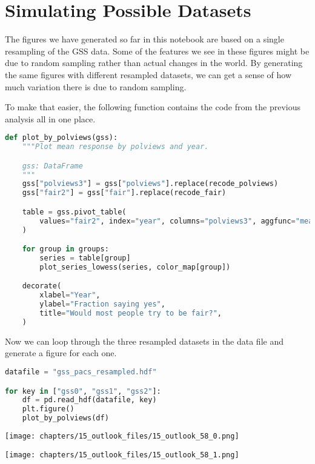\section{Simulating Possible
Datasets}\label{simulating-possible-datasets}

The figures we have generated so far in this notebook are based on a
single resampling of the GSS data. Some of the features we see in these
figures might be due to random sampling rather than actual changes in
the world. By generating the same figures with different resampled
datasets, we can get a sense of how much variation there is due to
random sampling.

To make that easier, the following function contains the code from the
previous analysis all in one place.

\begin{lstlisting}[language=Python,style=source]
def plot_by_polviews(gss):
    """Plot mean response by polviews and year.

    gss: DataFrame
    """
    gss["polviews3"] = gss["polviews"].replace(recode_polviews)
    gss["fair2"] = gss["fair"].replace(recode_fair)

    table = gss.pivot_table(
        values="fair2", index="year", columns="polviews3", aggfunc="mean"
    )

    for group in groups:
        series = table[group]
        plot_series_lowess(series, color_map[group])

    decorate(
        xlabel="Year",
        ylabel="Fraction saying yes",
        title="Would most people try to be fair?",
    )
\end{lstlisting}

Now we can loop through the three resampled datasets in the data file
and generate a figure for each one.

\begin{lstlisting}[language=Python,style=source]
datafile = "gss_pacs_resampled.hdf"

for key in ["gss0", "gss1", "gss2"]:
    df = pd.read_hdf(datafile, key)
    plt.figure()
    plot_by_polviews(df)
\end{lstlisting}

\begin{center}
\texttt{[image: chapters/15\_outlook\_files/15\_outlook\_58\_0.png]}
\end{center}

\begin{center}
\texttt{[image: chapters/15\_outlook\_files/15\_outlook\_58\_1.png]}
\end{center}

